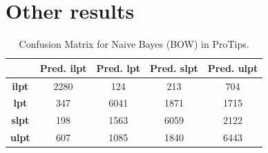 \documentclass[11pt,a4paper]{article}
\begin{document}
\section{Other results}
\label{sec:other_results}
\begin{table}[h!]
\centering
\begin{tabular}{c|c|c|c|c|}
\cline{2-5}
                                                            & \cellcolor[HTML]{EFEFEF}\textbf{Pred. ilpt} & \cellcolor[HTML]{EFEFEF}\textbf{Pred. lpt} & \cellcolor[HTML]{EFEFEF}\textbf{Pred. slpt} & \cellcolor[HTML]{EFEFEF}\textbf{Pred. ulpt} \\ \hline
\multicolumn{1}{|c|}{\cellcolor[HTML]{EFEFEF}\textbf{ilpt}} & 2280                                        & 124                                        & 213                                         & 704                                         \\ \hline
\multicolumn{1}{|c|}{\cellcolor[HTML]{EFEFEF}\textbf{lpt}}  & 347                                         & 6041                                       & 1871                                        & 1715                                        \\ \hline
\multicolumn{1}{|c|}{\cellcolor[HTML]{EFEFEF}\textbf{slpt}} & 198                                         & 1563                                       & 6059                                        & 2122                                        \\ \hline
\multicolumn{1}{|c|}{\cellcolor[HTML]{EFEFEF}\textbf{ulpt}} & 607                                         & 1085                                       & 1840                                        & 6443                                        \\ \hline
\end{tabular}
\caption{Confusion Matrix for Naive Bayes (BOW) in ProTips.}
\label{table:nb_cf}
\end{table}
\end{document}
